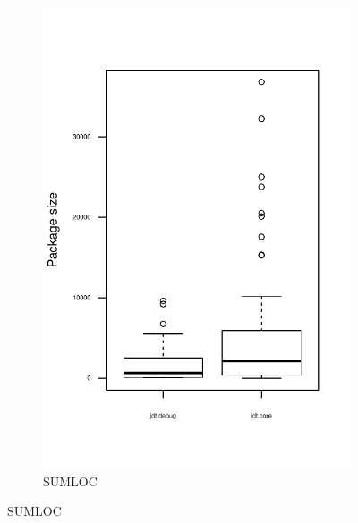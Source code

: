 \begin{figure}
\begin{subfigure}[b]{0.48\textwidth}
                \includegraphics[width=\textwidth]{img/package-size-sumloc.pdf}
                \caption{SUMLOC}
        \end{subfigure}


\end{figure}
